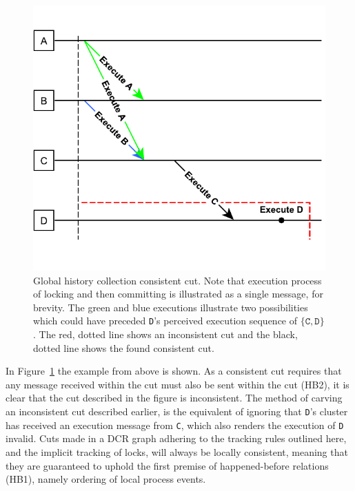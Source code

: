 \documentclass{article}
\begin{document}
	\begin{figure}[ht]
		\center
		\includegraphics[scale=0.6]{figures/dcr-graphs/global-history-collection-consistent-cut.pdf}
		\caption{Global history collection consistent cut. Note that execution process of locking and then committing is illustrated as a single message, for brevity. The green and blue executions illustrate two possibilities which could have preceded \texttt{D}'s perceived execution sequence of $\{\texttt{C}, \texttt{D}\}$. The red, dotted line shows an inconsistent cut and the black, dotted line shows the found consistent cut.}
		\label{fig:global-history-collection-consistent-cut}
	\end{figure}
    \FloatBarrier

	In Figure~\ref{fig:global-history-collection-consistent-cut} the example from above is shown.
	As a consistent cut requires that any message received within the cut must also be sent within the cut (HB2), it is clear that the cut described in the figure is inconsistent.
	The method of carving an inconsistent cut described earlier, is the equivalent of ignoring that \texttt{D}'s cluster has received an execution message from \texttt{C}, which also renders the execution of \texttt{D} invalid.
	Cuts made in a DCR graph adhering to the tracking rules outlined here, and the implicit tracking of locks, will always be locally consistent, meaning that they are guaranteed to uphold the first premise of happened-before relations (HB1), namely ordering of local process events.
\end{document}
